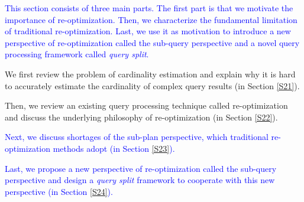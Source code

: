 \textcolor{blue}{
    This section consists of three main parts. The first part is that we motivate the importance of re-optimization. Then, we characterize the fundamental limitation of traditional re-optimization. Last, we use it as motivation to introduce a new perspective of re-optimization called the sub-query perspective and a novel query processing framework called \textit{query split}.
}
    \begin{itemize}[leftmargin = 15pt]
        \item We first review the problem of cardinality estimation and explain why it is hard to accurately estimate the cardinality of complex query results (in Section \ref{S21}).
        \item Then, we review an existing query processing technique called re-optimization and discuss the underlying philosophy of re-optimization (in Section \ref{S22}).
    \textcolor{blue}{
        \item Next, we discuss shortages of the sub-plan perspective, which traditional re-optimization methods adopt (in Section \ref{S23}).
        \item Last, we propose a new perspective of re-optimization called the sub-query perspective and design a \textit{query split} framework to cooperate with this new perspective (in Section \ref{S24}).
    }
    \end{itemize}

